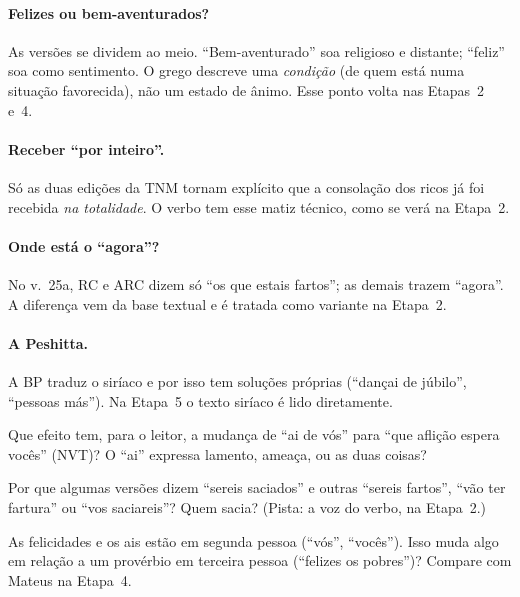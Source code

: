 \paragraph{Felizes ou bem-aventurados?} As versões se dividem ao meio.
\enquote{Bem-aventurado} soa religioso e distante; \enquote{feliz} soa como
sentimento. O grego  descreve uma \emph{condição} (de quem está
numa situação favorecida), não um estado de ânimo. Esse ponto volta nas
Etapas~2 e~4.

\paragraph{Receber \enquote{por inteiro}.} Só as duas edições da TNM tornam
explícito que a consolação dos ricos já foi recebida \emph{na totalidade}.
O verbo  tem esse matiz técnico, como se verá na Etapa~2.

\paragraph{Onde está o \enquote{agora}?} No v.~25a, RC e ARC dizem só
\enquote{os que estais fartos}; as demais trazem \enquote{agora}. A diferença
vem da base textual e é tratada como variante na Etapa~2.

\paragraph{A Peshitta.} A BP traduz o siríaco e por isso tem soluções
próprias (\enquote{dançai de júbilo}, \enquote{pessoas más}). Na Etapa~5 o
texto siríaco é lido diretamente.

\begin{pergunta}
Que efeito tem, para o leitor, a mudança de \enquote{ai de vós} para
\enquote{que aflição espera vocês} (NVT)? O \enquote{ai} expressa lamento,
ameaça, ou as duas coisas?
\end{pergunta}

\begin{pergunta}
Por que algumas versões dizem \enquote{sereis saciados} e outras
\enquote{sereis fartos}, \enquote{vão ter fartura} ou \enquote{vos
saciareis}? Quem sacia? (Pista: a voz do verbo, na Etapa~2.)
\end{pergunta}

\begin{pergunta}
As felicidades e os ais estão em segunda pessoa (\enquote{vós},
\enquote{vocês}). Isso muda algo em relação a um provérbio em terceira pessoa
(\enquote{felizes os pobres})? Compare com Mateus na Etapa~4.
\end{pergunta}
